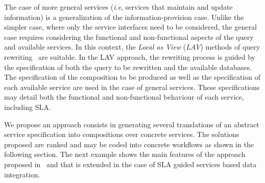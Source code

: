 The case of more general services (\textit{i.e}, services that maintain and update information) is a generalization of the information-provision case.
Unlike the simpler case, where only the service interfaces need to be considered, the general case requires considering the functional and non-functional aspects of the query and available services.
In this context, the \textit{Local as View} (\textit{LAV}) methods of query rewriting~\cite{Levy2000} are suitable.
In the LAV approach, the rewriting process is guided by the specification of both the query to be rewritten and the available databases.
The specification of the composition to be produced as well as the specification of each available service are used in the case of general services.
These specifications may detail both the functional and non-functional behaviour of each service, including SLA.


We propose an approach consists in generating several translations of an abstract service specification into compositions
over concrete  services. 
The solutions proposed are ranked and may be coded into concrete workflows as shown in the following section.  The next example shows the main features of the approach proposed in~\cite{CostaAMR13} and that is extended in the case of SLA guided services based data integration. 

